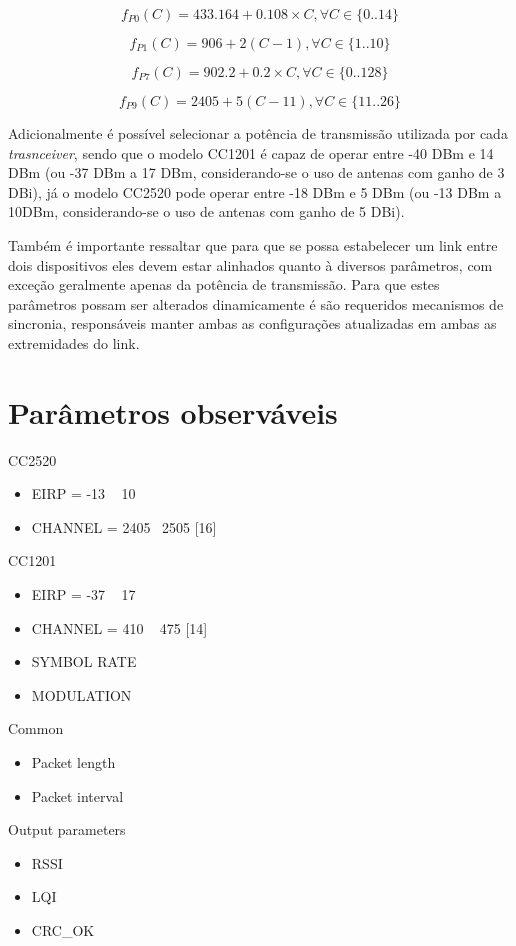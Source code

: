 \documentclass[
	12pt,				%
	openright,			%
	oneside,
	a4paper,			%
	english,			%
	french,				%
	spanish,			%
	brazil				%
	]{abntex2}
\begin{document}
	\begin{equation}
	\label{eq:ch433msk}
	f_{P0}(C) = 433.164 + 0.108\times C, \forall C \in \{0..14\}
	\end{equation}
	
	\begin{equation}
	\label{eq:ch915ask}
	f_{P1}(C) = 906 + 2 (C - 1), \forall C \in \{1..10\}
	\end{equation}
	
	\begin{equation}
	\label{eq:ch915fsk}
	f_{P7}(C) = 902.2 + 0.2 \times C, \forall C \in \{0..128\}
	\end{equation}
	
	\begin{equation}
	\label{eq:ch2450oqpsk}
	f_{P9}(C) = 2405 + 5 (C - 11), \forall C \in \{11..26\}
	\end{equation}
	
	Adicionalmente é possível selecionar a potência de transmissão utilizada por cada \textit{trasnceiver}, sendo que o modelo CC1201 é capaz de operar entre -40 DBm e 14 DBm (ou -37 DBm a 17 DBm, considerando-se o uso de antenas com ganho de 3 DBi), já o modelo CC2520 pode operar entre -18 DBm e 5 DBm (ou -13 DBm a 10DBm, considerando-se o uso de antenas com ganho de 5 DBi).
	
	Também é importante ressaltar que para que se possa estabelecer um link entre dois dispositivos eles devem estar alinhados quanto à diversos parâmetros, com exceção geralmente apenas da potência de transmissão. Para que estes parâmetros possam ser alterados dinamicamente é são requeridos mecanismos de sincronia, responsáveis manter ambas as configurações atualizadas em ambas as extremidades do link.
	\section{Parâmetros observáveis}
	CC2520
	\begin{itemize}
		\item EIRP = -13 ~ 10
		\item CHANNEL = 2405 ~2505 [16]
	\end{itemize}
	CC1201
	\begin{itemize}
		\item EIRP = -37 ~ 17
		\item CHANNEL = 410 ~ 475 [14]
		\item SYMBOL RATE
		\item MODULATION
	\end{itemize}
	Common
	\begin{itemize}
		\item Packet length
		\item Packet interval
	\end{itemize}
	Output parameters
	\begin{itemize}
		\item RSSI
		\item LQI
		\item CRC\_OK
	\end{itemize}
\end{document}
